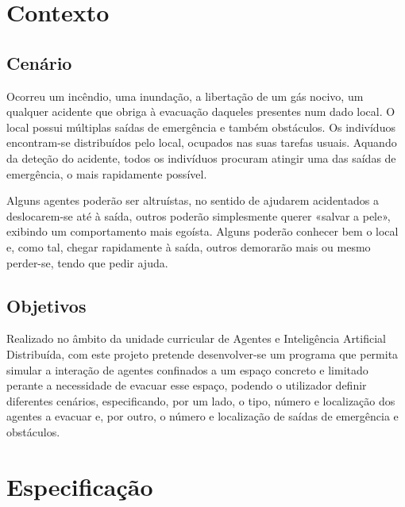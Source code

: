 \documentclass[12pt]{article}
\begin{document}
\begin{titlepage}

\section{Contexto}

\subsection{Cenário}

Ocorreu um incêndio, uma inundação, a libertação de um gás nocivo, um qualquer acidente que obriga à evacuação daqueles presentes num dado local. O local possui múltiplas saídas de emergência e também obstáculos. Os indivíduos encontram-se distribuídos pelo local, ocupados nas suas tarefas usuais. Aquando da deteção do acidente, todos os indivíduos procuram atingir uma das saídas de emergência, o mais rapidamente possível.

Alguns agentes poderão ser altruístas, no sentido de ajudarem acidentados a deslocarem-se até à saída, outros poderão simplesmente querer «salvar a pele», exibindo um comportamento mais egoísta. Alguns poderão conhecer bem o local e, como tal, chegar rapidamente à saída, outros demorarão mais ou mesmo perder-se, tendo que pedir ajuda. 


\subsection{Objetivos}

Realizado no âmbito da unidade curricular de Agentes e Inteligência Artificial Distribuída, com este projeto pretende desenvolver-se um programa que permita simular a interação de agentes confinados a um espaço concreto e limitado perante a necessidade de evacuar esse espaço, podendo o utilizador definir diferentes cenários, especificando, por um lado, o tipo, número e localização dos agentes a evacuar e, por outro, o número e localização de saídas de emergência e obstáculos. 


\newpage
\section{Especificação}

\end{titlepage}
\end{document}
